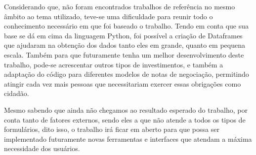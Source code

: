 Considerando que, não foram encontrados trabalhos de referência no mesmo âmbito ao tema utilizado, teve-se uma dificuldade para reunir todo o conhecimento necessário em que foi baseado o trabalho. Tendo em conta que sua base se dá em cima da linguagem Python, foi possível a criação de Dataframes que ajudaram na obtenção dos dados tanto eles em grande, quanto em pequena escala. Também para que futuramente tenha um melhor desenvolvimento deste trabalho, pode-se acrescentar outros tipos de investimentos, e também a adaptação do código para diferentes modelos de notas de negociação, permitindo atingir cada vez mais pessoas que necessitariam exercer essas obrigações como cidadão.

Mesmo sabendo que ainda não  chegamos ao resultado esperado do trabalho, por conta tanto de fatores externos, sendo eles a que não atende a todos os tipos de formulários, dito isso, o trabalho irá ficar em aberto para que possa ser implementado futuramente novas ferramentas e interfaces que atendam a máxima necessidade dos usuários.


